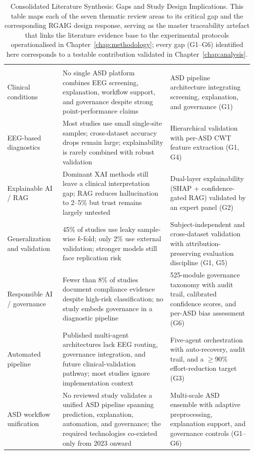 {\tablestripes\tablefontsize
\begin{xltabular}{\textwidth}{@{}>{\raggedright\arraybackslash}p{2.2cm} X X@{}}
\caption[Consolidated Literature Synthesis: Gaps and Study Design]{Consolidated Literature Synthesis: Gaps and Study Design Implications. This table maps each of the seven thematic review areas to its critical gap and the corresponding RGAIG design response, serving as the master traceability artefact that links the literature evidence base to the experimental protocols operationalised in Chapter~\ref{chap:methodology}; every gap (G1--G6) identified here corresponds to a testable contribution validated in Chapter~\ref{chap:analysis}.}\label{tab:lit_synthesis_consolidated} \\
\toprule
{} &  &  \\
\midrule
\endfirsthead
\toprule
{} &  &  \\
\midrule
\endhead
\bottomrule
\endlastfoot
Clinical conditions & No single ASD platform combines EEG screening, explanation, workflow support, and governance despite strong point-performance claims & ASD pipeline architecture integrating screening, explanation, and governance (G1) \\
\addlinespace
EEG-based diagnostics & Most studies use small single-site samples; cross-dataset accuracy drops remain large; explainability is rarely combined with robust validation & Hierarchical validation with per-ASD CWT feature extraction (G1, G4) \\
\addlinespace
Explainable AI / RAG & Dominant XAI methods still leave a clinical interpretation gap; RAG reduces hallucination to 2--5\% but trust remains largely untested & Dual-layer explainability (SHAP + confidence-gated RAG) validated by an expert panel (G2) \\
\addlinespace
Generalization and validation & 45\% of studies use leaky sample-wise $k$-fold; only 2\% use external validation; stronger models still face replication risk & Subject-independent and cross-dataset validation with attribution-preserving evaluation discipline (G1, G5) \\
\addlinespace
Responsible AI / governance & Fewer than 8\% of studies document compliance evidence despite high-risk classification; no study embeds governance in a diagnostic pipeline & 525-module governance taxonomy with audit trail, calibrated confidence scores, and per-ASD bias assessment (G6) \\
\addlinespace
Automated pipeline & Published multi-agent architectures lack EEG routing, governance integration, and future clinical-validation pathway; most studies ignore implementation context & Five-agent orchestration with auto-recovery, audit trail, and a $\geq$90\% effort-reduction target (G3) \\
\addlinespace
ASD workflow unification & No reviewed study validates a unified ASD pipeline spanning prediction, explanation, automation, and governance; the required technologies co-existed only from 2023 onward & Multi-scale ASD ensemble with adaptive preprocessing, explanation support, and governance controls (G1--G6) \\
\end{xltabular}}
